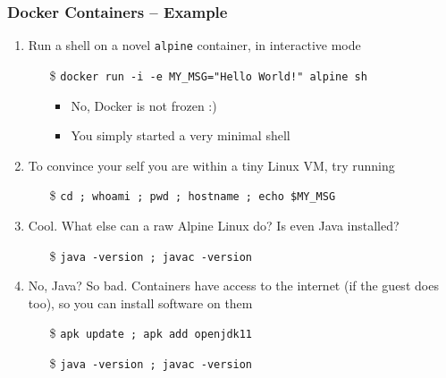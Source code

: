 \documentclass[presentation]{beamer}\mode<presentation>{\usetheme{AMSBolognaFC}}
\begin{document}
\begin{frame}[allowframebreaks]
\frametitle{Docker Containers -- Example}

    \begin{enumerate}
        \item Run a shell on a novel \texttt{alpine} container, in interactive mode
        \begin{itemize}
            \item[\$] \texttt{docker run -i -e MY\_MSG="Hello World!" alpine sh}
            \begin{itemize}
                \item No, Docker is not frozen :)
                \item You simply started a \alert{very minimal} shell
            \end{itemize}
        \end{itemize}

        \vfill

        \item To convince your self you are within a tiny Linux VM, try running
        \begin{itemize}
            \item[\$] \texttt{cd ; whoami ; pwd ; hostname ; echo \$MY\_MSG}
        \end{itemize}

        \vfill

        \item Cool. What else can a raw Alpine Linux do? Is even Java installed?
        \begin{itemize}
            \item[\$] \texttt{java -version ; javac -version}
        \end{itemize}

        \vfill

        \item No, Java? So bad. Containers have access to the internet (if the guest does too), so you can install software on them
        \begin{itemize}
            \item[\$] \texttt{apk update ; apk add openjdk11} 
            \item[\$] \texttt{java -version ; javac -version}
        \end{itemize}


\end{enumerate}
\end{frame}
\end{document}
